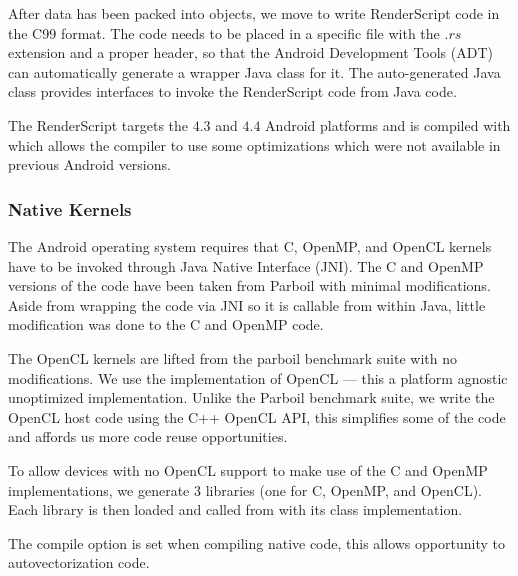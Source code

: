 After data has been packed into  objects, we move to write
RenderScript code in the C99 format. The code needs to be placed in a specific file
with the $.rs$ extension and a proper header, so that the Android Development
Tools (ADT) can automatically generate a wrapper Java class for it. The
auto-generated Java class provides interfaces to invoke the RenderScript code
from Java code.

The RenderScript targets the $4.3$ and $4.4$ Android platforms and 
	is compiled with  which
	allows the compiler to use some optimizations which were not available in
	previous Android versions.

\subsubsection{Native Kernels}

The Android operating system requires that C, OpenMP, and OpenCL kernels have to
be invoked through Java Native Interface (JNI).  The C and OpenMP versions of
the code have been taken from Parboil with minimal modifications.  Aside from
wrapping the code via JNI so it is callable from within Java, little
modification was done to the C and OpenMP code.

The OpenCL kernels are lifted from the parboil benchmark suite with no
modifications.  We use the  implementation of OpenCL --- this a
platform agnostic unoptimized implementation.  Unlike the Parboil benchmark
suite, we write the OpenCL host code using the C++ OpenCL API, this simplifies
some of the code and affords us more code reuse opportunities.

To allow devices with no OpenCL support to make use of the C and OpenMP
implementations, we generate 3 libraries (one for C, OpenMP, and OpenCL).  Each
library is then loaded and called from with its class implementation.

The 
 compile option  is set when compiling native code, this allows opportunity to autovectorization code.
